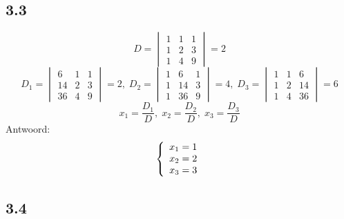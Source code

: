 \documentclass[11pt]{article}
\begin{document}
\subsection*{3.3}
\[D=
\begin{vmatrix}
1 & 1 & 1 \\
1 & 2 & 3 \\
1 & 4 & 9 
\end{vmatrix}
=2\]
\[D_1=
\begin{vmatrix}
6 & 1 & 1 \\
14 & 2 & 3 \\
36 & 4 & 9
\end{vmatrix}
=2,\;D_2=
\begin{vmatrix}
1 & 6 & 1 \\
1 & 14 & 3 \\
1 & 36 & 9
\end{vmatrix}
=4,\;D_3=
\begin{vmatrix}
1 & 1 & 6 \\
1 & 2 & 14 \\
1 & 4 & 36
\end{vmatrix}
=6
\]
$$x_1=\frac{D_1}{D},\;x_2=\frac{D_2}{D},\;x_3=\frac{D_3}{D}$$
Antwoord:\\
\[
\left\lbrace
\begin{array}{l l}
x_1=1\\
x_2=2\\
x_3=3
\end{array}
\right.
\]

\subsection*{3.4}
\end{document}
